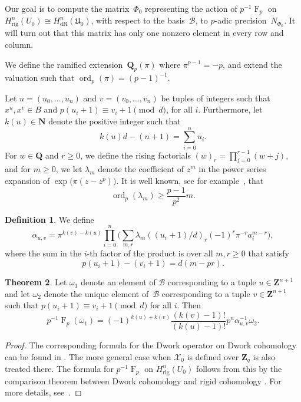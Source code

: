 \documentclass[a4paper,11pt]{article}
\numberwithin{equation}{section}
\newcommand{\NN}{\mathbf{N}} %
\newcommand{\ZZ}{\mathbf{Z}} %
\newcommand{\QQ}{\mathbf{Q}} %
\DeclareMathOperator{\ord}{ord}          %
\DeclareMathOperator{\Frob}{F}           %
\providecommand{\HdR}{H_{\text{dR}}}    %
\providecommand{\Hrig}{H_{\text{rig}}}  %
\providecommand{\cB}{\mathcal{B}} %
\theoremstyle{definition}
\newtheorem{thm}{Theorem}[section]
\newtheorem{defn}[thm]{Definition}
\begin{document}
Our goal is to compute 
the matrix~$\Phi_0$ representing the action of $p^{-1} \Frob_p$ on 
$\Hrig^n(U_0) \cong \HdR^n(\mathfrak{U}_0)$, with respect to the basis~$\cB$, 
to $p$-adic precision~$N_{\Phi_0}$. It will turn out that this matrix has only one
nonzero element in every row and column.

We define the ramified extension~$\QQ_p(\pi)$ where $\pi^{p-1} = -p$, 
and extend the valuation such that \mbox{$\ord_p(\pi) = (p-1)^{-1}$}.

Let $u = (u_0, \dotsc, u_n)$ and $v = (v_0, \dotsc, v_n)$ be tuples 
of integers such that $x^u, x^v \in B$ and $p (u_i+1) \equiv v_i+1 \pmod{d}$,
for all $i$. Furthermore, let $k(u) \in \NN$ denote the positive integer such that 
\[
k(u) d -(n+1) = \sum_{i=0}^n u_i.
\] 
For $w \in \QQ$ 
and $r \geq 0$, we define the rising factorials $(w)_r = \prod_{j=0}^{r-1} (w + j)$, 
and for $m \geq 0$, we let $\lambda_m$ denote the coefficient of $z^m$ in the 
power series expansion of $\exp \bigl( \pi (z - z^p) \bigr)$. It is well known, see 
for example~\citep{Dwork1962}, that 
\begin{equation} \label{eqn:dworkbound}
\ord_p(\lambda_m) \geq \frac{p-1}{p^2} m. 
\end{equation}

\begin{defn} We define \label{defn:alpha}
\[
\alpha_{u,v} = \pi^{k(v) - k(u)} \prod_{i = 0}^n \biggl( \sum_{m, r} \lambda_m ((u_i + 1) / d)_r (-1)^r \pi^{-r} a_i^{m-r} \biggr),
\]
where the sum in the $i$-th factor of the product is over all $m, r \geq 0$  
that satisfy
\[
p(u_i+1)-(v_i+1)=d(m-pr).
\]
\end{defn}

\begin{thm} \label{thm:01-03-diagfrob}
Let $\omega_1$ denote an element of $\cB$ corresponding to a tuple 
$u \in \ZZ^{n+1}$ and let $\omega_2$ denote the unique element of~$\cB$ 
corresponding to a tuple $v \in \ZZ^{n+1}$ such that
$p (u_i + 1) \equiv v_i + 1 \pmod{d}$ for all $i$. Then
\begin{equation*}
p^{-1} \Frob_p (\omega_1) = 
    (-1)^{k(u) + k(v)} \frac{(k(v) - 1)!}{(k(u) - 1)!} p^n \alpha_{u,v}^{-1} \omega_2.
\end{equation*}
\end{thm}

\begin{proof}
The corresponding formula for the Dwork operator on Dwork cohomology can
be found in %
\citep[\S 6.1]{Lauder2004b}. The more general case when $\mathcal{X}_0$ 
is defined over $\ZZ_q$ is also treated there. The formula for 
$p^{-1} \Frob_p$ on $\Hrig^n(U_0)$ follows from this by the comparison theorem 
between Dwork cohomology and rigid cohomology \citep[Theorem 1.12]{Katz}. 
For more details, see~\citep[Theorem 4.4]{Gerkmann2007}.
\end{proof}
\end{document}
